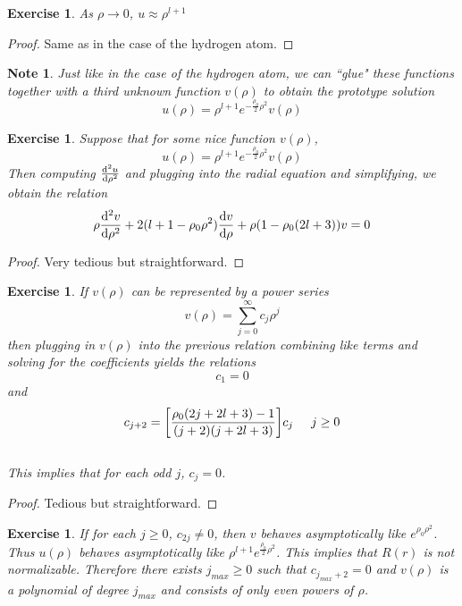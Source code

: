 \documentclass[12pt]{amsart}
\newtheorem{note}[thm]{Note}
\newtheorem{ex}[thm]{Exercise}
\begin{document}
\begin{ex}
As $\rho \rightarrow 0$, $u \approx \rho^{l+1}$
\end{ex}

\begin{proof}
Same as in the case of the hydrogen atom.
\end{proof}

\begin{note}
Just like in the case of the hydrogen atom, we can ``glue" these functions together with a third unknown function $v(\rho)$ to obtain the prototype solution $$u(\rho) = \rho^{l+1}e^{-\frac{\rho_0}{2}\rho^2}v(\rho)$$
\end{note}

\begin{ex}
Suppose that for some nice function $v(\rho)$, $$u(\rho) = \rho^{l+1}e^{-\frac{\rho_0}{2}\rho^2}v(\rho)$$ Then computing $\dv[2]{u}{\rho}$ and plugging into the radial equation and simplifying, we obtain the relation $$\rho \dv[2]{v}{\rho} +2(l+1 - \rho_0\rho^2)\dv{v}{\rho} + \rho(1-\rho_0(2l+3))v = 0$$
\end{ex}

\begin{proof}
Very tedious but straightforward.
\end{proof}

\begin{ex}
If $v(\rho)$ can be represented by a power series $$v(\rho) = \sum_{j=0}^{\infty}c_j\rho^j$$ then plugging in $v(\rho)$ into the previous relation combining like terms and solving for the coefficients yields the relations $$c_1 = 0$$ and $$c_{j+2} = \bigg[ \frac{\rho_0(2j+2l+3)-1}{(j+2)(j+2l+3)}\bigg]c_j \hspace{5mm} j \geq 0$$ \vspace{3mm} \\This implies that for each odd $j$, $c_j = 0$. \vspace{3mm}
\end{ex}

\begin{proof}
Tedious but straightforward.
\end{proof}

\begin{ex}
If for each $j \geq 0$, $c_{2j} \neq 0$, then $v$ behaves asymptotically like $e^{\rho_0\rho^2}$. Thus $u(\rho)$ behaves asymptotically like $\rho^{l+1}e^{\frac{\rho_0}{2}\rho^2}$. This implies that $R(r)$ is not normalizable. Therefore there exists $j_{max} \geq 0$ such that $c_{j_{max}+2} = 0$ and $v(\rho)$ is a polynomial of degree $j_{max}$ and consists of only even powers of $\rho$. 
\end{ex}
\end{document}
